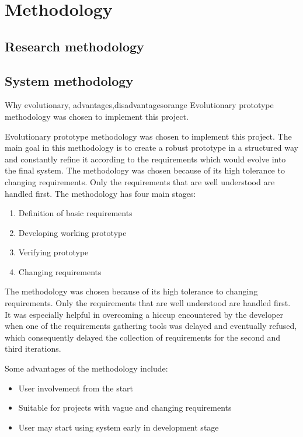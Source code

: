 \chapter{Methodology}
\section{Research methodology}

\section{System methodology}
\begin{review_comment}{Why evolutionary, advantages,disadvantages}{orange}
{Evolutionary prototype methodology was chosen to implement this project.}
\end{review_comment}
Evolutionary prototype methodology was chosen to implement this project. The main goal in this methodology is to create a robust prototype in a structured way and constantly refine it according to the requirements which would evolve into the final system. The methodology was chosen because of its high tolerance to changing requirements. Only the requirements that are well understood are handled first. The methodology has four main stages:
\begin{enumerate}
\item Definition of basic requirements
\item Developing working prototype
\item Verifying prototype
\item Changing requirements
\end{enumerate}

The methodology was chosen because of its high tolerance to changing requirements. Only the requirements that are well understood are handled first. It was especially helpful in overcoming a hiccup encountered by the developer when one of the requirements gathering tools was delayed and eventually refused, which consequently delayed the collection of requirements for the second and third iterations.

Some advantages of the methodology include:
\begin{itemize}
\item User involvement from the start
\item Suitable for projects with vague and changing requirements
\item User may start using system early in development stage
\end{itemize}

